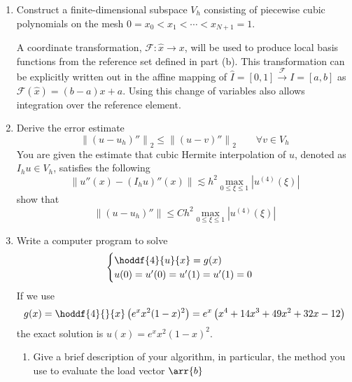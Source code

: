 \documentclass{article}
\newcommand\NoIndent[1]{%
  \begingroup
  \par
  \parshape0
  #1\par
  \endgroup
}
\begin{document}
\begin{enumerate}
\begin{enumerate}
{\begin{table}[h]
\begin{tabular}{c|c}
		\hline
		\end{tabular}
	\end{table}
}
			\item Construct a finite-dimensional subspace $V_h$ consisting of
				piecewise cubic polynomials on the mesh $0 = x_0 < x_1 < \cdots < x_{N+1} = 1$.
\NoIndent{
	A coordinate transformation, $\mathcal{F}:\hat{x}\rightarrow x$,
	will be used to produce local basis functions from the reference set defined in part (b).
	This transformation can be explicitly written out in the affine mapping of
	$\hat{I} = [0,1] \xrightarrow{\mathcal{F}} I = [a,b]$ as $\mathcal{F}(\hat{x}) = (b-a)x + a$.
	Using this change of variables also allows integration over the reference element.
}
			\item Derive the error estimate
				\begin{equation*}
					\left\|\left(u - u_h\right)''\right\|_2 \leq \left\|\left(u - v\right)''\right\|_2
						\qquad \forall v \in V_h
				\end{equation*}
				You are given the estimate that cubic Hermite interpolation of $u$,
				denoted as $I_h u \in V_h$, satisfies the following
				\begin{equation*}
					\left\|u''(x) - \left(I_h u\right)''(x)\right\| \lesssim
						h^2\max_{0\leq\xi\leq 1}\left|u^{(4)}(\xi)\right|
				\end{equation*}
				show that
				\begin{equation*}
					\left\|\left(u - u_h\right)''\right\| \leq
						Ch^2\max_{0\leq\xi\leq 1}\left|u^{(4)}(\xi)\right|
				\end{equation*}
			\item Write a computer program to solve
				\begin{equation*}
					\begin{cases}
						\displaystyle\hoddf{4}{u}{x} = g(x) \\
						u(0) = u'(0) = u'(1) = u'(1) = 0
					\end{cases}
				\end{equation*}
				If we use
				\begin{equation*}
					g(x) = \hoddf{4}{}{x}\left(e^x x^2(1 - x)^2\right) =
						e^x\left(x^4 + 14x^3 + 49x^2 + 32x - 12\right)
				\end{equation*}
				the exact solution is $u(x) = e^x x^2(1 - x)^2$.
				\begin{enumerate}
					\item Give a brief description of your algorithm, in particular,
						the method you use to evaluate the load vector $\arr{b}$

\end{enumerate}
\end{enumerate}
\end{enumerate}
\end{document}
